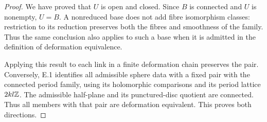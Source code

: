 \begin{proof}
We have proved that $U$ is open
and closed.  Since $B$ is
connected and $U$ is nonempty,
$U=B$.  A nonreduced base
does not add fibre isomorphism
classes: restriction to its
reduction preserves both the
fibres and smoothness of the
family.  Thus the same conclusion
also applies to such a base
when it is admitted in the
definition of deformation
equivalence.

Applying this result to each
link in a finite deformation
chain preserves the pair.
Conversely, E.1 identifies
all admissible sphere data
with a fixed pair with the
connected period family,
using its holomorphic
comparisons and its period
lattice $2kl\mathbb Z$.
The admissible half-plane
and its punctured-disc
quotient are connected.
Thus all members with
that pair are deformation
equivalent.  This proves
both directions.
\end{proof}
